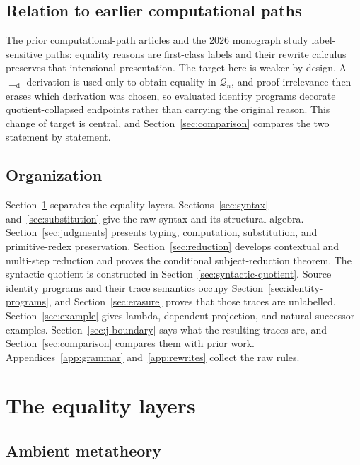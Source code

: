 \documentclass[10pt,reqno]{amsart}
\newcommand{\defeq}{\mathrel{\equiv_{\mathrm d}}}
\newcommand{\Q}{\mathcal{Q}}
\begin{document}
\subsection*{Relation to earlier computational paths}

The prior computational-path articles
\cite{deQueirozEtAl2016,RamosEtAl2017,RamosEtAl2018} and the 2026 monograph
\cite{RamosEtAl2026} study label-sensitive paths: equality reasons are
first-class labels and their rewrite calculus preserves that intensional
presentation.  The target here is weaker by design.  A \(\defeq\)-derivation is
used only to obtain equality in \(\Q_n\), and proof irrelevance then erases
which derivation was chosen, so evaluated identity programs decorate
quotient-collapsed endpoints rather than carrying the original reason.  This
change of target is central, and Section~\ref{sec:comparison} compares the two
statement by statement.

\subsection*{Organization}

Section~\ref{sec:layers} separates the equality layers.
Sections~\ref{sec:syntax} and~\ref{sec:substitution} give the raw syntax and
its structural algebra.  Section~\ref{sec:judgments} presents typing,
computation, substitution, and primitive-redex preservation.
Section~\ref{sec:reduction} develops contextual and multi-step reduction and
proves the conditional subject-reduction theorem.  The syntactic
quotient is constructed in Section~\ref{sec:syntactic-quotient}.  Source identity programs
and their trace semantics occupy Section~\ref{sec:identity-programs}, and
Section~\ref{sec:erasure} proves that those traces are unlabelled.
Section~\ref{sec:example} gives lambda, dependent-projection, and
natural-successor examples.  Section~\ref{sec:j-boundary} says what the
resulting traces are, and Section~\ref{sec:comparison} compares them with
prior work.
Appendices~\ref{app:grammar} and~\ref{app:rewrites} collect the raw rules.

\section{The equality layers}
\label{sec:layers}

\subsection{Ambient metatheory}
\label{sec:ambient}
\end{document}
